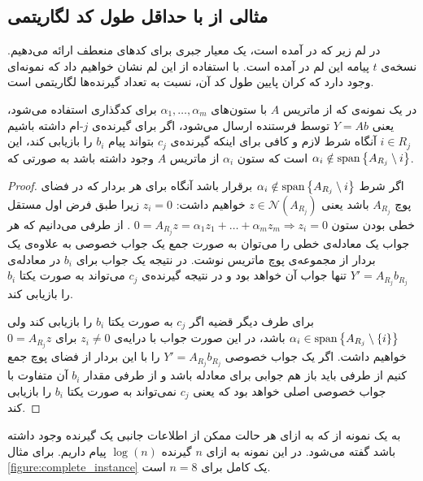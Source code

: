 \subsection{
	مثالی از
\lpicod
با حداقل طول کد لگاریتمی
}
در لم زیر که در
\cite{song2016deterministic}
آمده است، یک معیار جبری برای کدهای منعطف ارائه می‌دهیم. نسخه‌ی
$t$
پیامه این لم در
\cite{linqiphd}
آمده است. با استفاده از این لم نشان خواهیم داد که نمونه‌ای وجود دارد که کران پایین طول کد آن، نسبت به تعداد گیرنده‌ها لگاریتمی است. 
\begin{lemma}
	\label{lemma:algebraicconstraint}
	در یک نمونه‌ی
	\lpicod
	که از ماتریس
	$A$
	با ستون‌های 
	$\alpha_1, \ldots, \alpha_m$
	برای کدگذاری استفاده می‌شود، یعنی
	$Y = A b$
	توسط فرستنده ارسال می‌شود، اگر برای گیرنده‌ی
	$j$-ام
	داشته باشیم
	$i \in R_j$
	آنگاه شرط لازم و کافی برای اینکه گیرنده‌‌ی 
	$c_j$
	بتواند پیام 
	$b_i$
	را بازیابی کند، این است که ستون
	$\alpha_i$
	از ماتریس
	$A$
	وجود داشته باشد به صورتی که
	$\alpha_i \notin \operatorname{span} \left\{ A_{R_j} \setminus i \right\}$.
\end{lemma}
\begin{proof}
	اگر شرط
	$\alpha_i \notin \operatorname{span}\left\{ A_{R_j} \setminus i \right\}$
	برقرار باشد آنگاه برای هر بردار که در فضای پوچ
	$A_{R_j}$
	باشد یعنی
	$z \in \mathcal{N}(A_{R_j})$
	خواهیم داشت:
	$z_i = 0$
	زیرا طبق فرض اول مستقل خطی بودن ستون
	$0 = A_{R_j} z  = \alpha_1 z_1 + \ldots + \alpha_m z_m \Rightarrow z_i = 0$
	.  از طرفی می‌دانیم که هر جواب یک معادله‌ی خطی را می‌توان به صورت جمع یک جواب خصوصی به علاوه‌ی یک بردار از مجموعه‌ی پوچ ماتریس نوشت. در نتیجه یک جواب برای 
	$b_i$
	در معادله‌ی
	$Y' = A_{R_j} b_{R_j}$
	تنها جواب آن خواهد بود و در نتیجه گیرنده‌ی
	$c_j$
	می‌تواند به صورت یکتا
	$b_i$
	را بازیابی کند.
	
	برای طرف دیگر قضیه اگر 
	$c_j$
	به صورت یکتا
	$b_i$
	را بازیابی کند ولی
	$\alpha_i \in \operatorname{span}\left\{ A_{R_j} \setminus \left\{ i \right\} \right\}$
	باشد، در این صورت جواب با درایه‌ی
	$z_i \neq 0$
	برای
	$0 = A_{R_j} z$
	خواهیم داشت. اگر یک جواب خصوصی
	$Y' = A_{R_j} b_{R_j}$
	را با این بردار از فضای پوچ جمع کنیم از طرفی باید باز هم جوابی برای معادله باشد و از طرفی مقدار
	$b_i$
	آن متفاوت با جواب خصوصی اصلی خواهد بود که یعنی 
	$c_j$
	نمی‌تواند به صورت یکتا
	$b_i$
	را بازیابی کند.	
\end{proof}
\begin{definition}
	به یک نمونه از
	\picod
	که به ازای هر حالت ممکن از اطلاعات جانبی یک گیرنده وجود داشته باشد گفته می‌شود. در این نمونه به ازای
	$n$
	گیرنده
	$\log(n)$
	پیام داریم.	 برای مثال
	\autoref{figure:complete_instance}
	یک
	\picod
	کامل برای
	$n= 8$
	است.
\end{definition}
